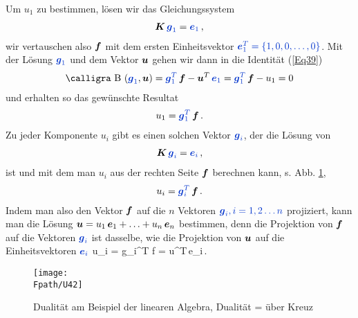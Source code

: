 Um $u_1$ zu bestimmen, l\"{o}sen wir das Gleichungssystem
\begin{align}\label{Eq38}
\vek K\,\textcolor{chapterTitleBlue}{\vek g_1} = \textcolor{chapterTitleBlue}{\vek e_1}\,,
\end{align}
wir vertauschen also $\mbox{\boldmath $f$}$ mit dem ersten Einheitsvektor $\textcolor{chapterTitleBlue}{\vek e_1^T = \{1,0,0,\ldots,0\}}$.
Mit der L\"{o}sung $\textcolor{chapterTitleBlue}{\vek g_1}$ und dem Vektor $\mbox{\boldmath $u$}$ gehen wir dann in
die Identit\"{a}t (\ref{Eq39})
\begin{align}
\text{\normalfont\calligra B\,\,}(\textcolor{chapterTitleBlue}{\vek g_1},\vek u) = \textcolor{chapterTitleBlue}{\vek g_1^T}\,\vek f - \vek u^T\,\textcolor{chapterTitleBlue}{\vek e_1} = \textcolor{chapterTitleBlue}{\vek g_1^T}\,\vek f - u_1 = 0
\end{align}
und erhalten so das gew\"{u}nschte Resultat
\begin{align}
u_1 = \textcolor{chapterTitleBlue}{\vek g_1^T}\,\vek f\,.
\end{align}
Zu jeder Komponente $u_i$ gibt es einen solchen Vektor $\textcolor{chapterTitleBlue}{\vek g_i}$, der die L\"{o}sung von
\begin{align}
\vek K\,\textcolor{chapterTitleBlue}{\vek g_i }= \textcolor{chapterTitleBlue}{\vek e_i}\,,
\end{align}
ist und mit dem man $u_i$ aus der rechten Seite $\mbox{\boldmath $f$}$ berechnen kann, s. Abb. \ref{U42},
\begin{align}
u_i = \textcolor{chapterTitleBlue}{\vek g_i^T}\,\vek f\,.
\end{align}
Indem man also den Vektor $\mbox{\boldmath $f$}$ auf die $n$ Vektoren $\textcolor{chapterTitleBlue}{\vek g_i, i = 1, 2 \ldots n}$ projiziert, kann man die L\"{o}sung $\mbox{\boldmath $u$} = u_1\,\mbox{\boldmath $e$}_1 + \ldots + u_n\,\mbox{\boldmath $e$}_n$
bestimmen, denn die Projektion von $\mbox{\boldmath $f$}$ auf die Vektoren $\textcolor{chapterTitleBlue}{\vek g_i}$ ist dasselbe, wie die Projektion von $\mbox{\boldmath $u$}$ auf die Einheitsvektoren $\textcolor{chapterTitleBlue}{\vek e_i}$
\beq\label{Eq40}
u_i = \textcolor{chapterTitleBlue}{\vek g_i^T} \vek f = \vek u^T\,\textcolor{chapterTitleBlue}{\vek e_i}\,.
\eeq
\begin{figure}[tbp]
\centering
\texttt{[image: \\Fpath/U42]}
\caption{Dualit\"{a}t am Beispiel der linearen Algebra, Dualit\"{a}t = \glq \"{u}ber Kreuz\grq{}}
\label{U42}%
\end{figure}%
